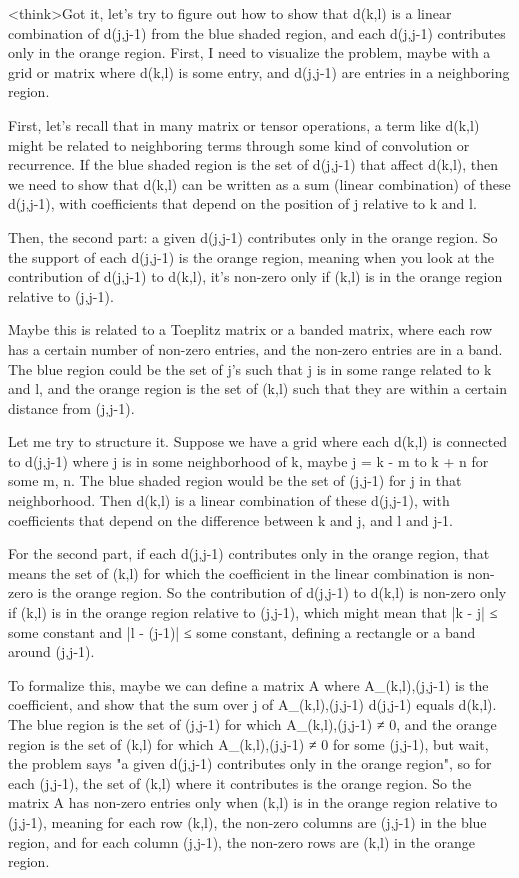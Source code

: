 <think>Got it, let's try to figure out how to show that d(k,l) is a linear combination of d(j,j-1) from the blue shaded region, and each d(j,j-1) contributes only in the orange region. First, I need to visualize the problem, maybe with a grid or matrix where d(k,l) is some entry, and d(j,j-1) are entries in a neighboring region. 

First, let's recall that in many matrix or tensor operations, a term like d(k,l) might be related to neighboring terms through some kind of convolution or recurrence. If the blue shaded region is the set of d(j,j-1) that affect d(k,l), then we need to show that d(k,l) can be written as a sum (linear combination) of these d(j,j-1), with coefficients that depend on the position of j relative to k and l. 

Then, the second part: a given d(j,j-1) contributes only in the orange region. So the support of each d(j,j-1) is the orange region, meaning when you look at the contribution of d(j,j-1) to d(k,l), it's non-zero only if (k,l) is in the orange region relative to (j,j-1). 

Maybe this is related to a Toeplitz matrix or a banded matrix, where each row has a certain number of non-zero entries, and the non-zero entries are in a band. The blue region could be the set of j's such that j is in some range related to k and l, and the orange region is the set of (k,l) such that they are within a certain distance from (j,j-1). 

Let me try to structure it. Suppose we have a grid where each d(k,l) is connected to d(j,j-1) where j is in some neighborhood of k, maybe j = k - m to k + n for some m, n. The blue shaded region would be the set of (j,j-1) for j in that neighborhood. Then d(k,l) is a linear combination of these d(j,j-1), with coefficients that depend on the difference between k and j, and l and j-1. 

For the second part, if each d(j,j-1) contributes only in the orange region, that means the set of (k,l) for which the coefficient in the linear combination is non-zero is the orange region. So the contribution of d(j,j-1) to d(k,l) is non-zero only if (k,l) is in the orange region relative to (j,j-1), which might mean that |k - j| ≤ some constant and |l - (j-1)| ≤ some constant, defining a rectangle or a band around (j,j-1). 

To formalize this, maybe we can define a matrix A where A_{(k,l),(j,j-1)} is the coefficient, and show that the sum over j of A_{(k,l),(j,j-1)} d(j,j-1) equals d(k,l). The blue region is the set of (j,j-1) for which A_{(k,l),(j,j-1)} ≠ 0, and the orange region is the set of (k,l) for which A_{(k,l),(j,j-1)} ≠ 0 for some (j,j-1), but wait, the problem says "a given d(j,j-1) contributes only in the orange region", so for each (j,j-1), the set of (k,l) where it contributes is the orange region. So the matrix A has non-zero entries only when (k,l) is in the orange region relative to (j,j-1), meaning for each row (k,l), the non-zero columns are (j,j-1) in the blue region, and for each column (j,j-1), the non-zero rows are (k,l) in the orange region. 

